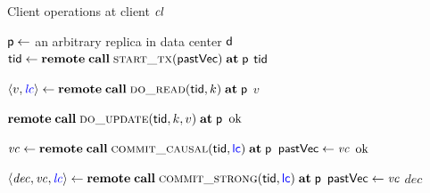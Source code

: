 
\begin{algorithm*}[t]
  \caption{Client operations at client $\mathit{cl}$}
  \label{alg:unistore-client}
  \begin{algorithmic}[1]
    \Function{\start}{\null}
      \label{line:function-starttx}
      \State ${\sf p} \gets$ an arbitrary replica in data center ${\sf d}$
        \label{line:starttx-random-partition}
      \State $\ctid \gets \rpc \Call{\starttx}{\pastVC} \at \clientcoord$
        \label{line:starttx-call-start}
        \Comment{\tscolor{$\timestamp(\start) \gets
          \snapVC^{\clientcoord}_{\clientdc}[\ctid]$}}
        \label{line:starttx-ts}
      \State \Return ${\sf tid}$
        \label{line:starttx-return}
    \EndFunction

    \Statex
     \label{line:function-read}
      \State $\langle v, \lccolor{\lcvar} \rangle \gets
        \rpc \Call{\doread}{\ctid, k} \at \clientcoord$
        \label{line:read-call-doread}
      \If{$\lcvar \neq \bot$}
        \label{line:read-is-external}
        \State \lccolor{$\lc \gets \max\set{\lc, \lcvar}$}
          \label{line:read-lc}
      \EndIf
      \State \Return $v$
        \label{line:read-return}
    \EndFunction

    \Statex
     \label{line:function-update}
      \State $\rpc \Call{\doupdate}{\ctid, k, v} \at \clientcoord$
        \label{line:update-call-doupdate}
      \State \Return $\mathrm{ok}$
        \label{line:update-return}
    \EndFunction

    \Statex
    \Function{\commitcausaltx}{\null}
      \label{line:function-commitcausaltx}
      \State {}
        \Comment{\lccolor{$\lclock(\commitcausaltx) \gets \lc$}}
        \label{line:commitcausaltx-lc}
      \State $\vcvar \gets \rpc \Call{\commitcausal}{\ctid, \lccolor{\lc}} \at \clientcoord$
        \label{line:commitcausaltx-call-commitcausal}
      \State ${\sf pastVec} \gets \mathit{vc}$
        \label{line:commitcausaltx-pastvc}
        \Comment{\tscolor{$\timestamp(\commitcausaltx) \gets \pastVC$}}
        \label{line:commitcausaltx-ts}
      \State \Return $\mathrm{ok}$
        \label{line:commitcausaltx-return}
    \EndFunction

    \Statex
    \Function{\commitstrongtx}{\null}
      \label{line:function-commitstrongtx}
      \State {}
        \label{line:commitstrongtx-lc-so}
      \State $\langle \decvar, \vcvar, \lccolor{\lcvar} \rangle \gets \rpc
        \Call{\commitstrong}{\ctid, \lccolor{\lc}} \at \clientcoord$
        \label{line:commitstrongtx-call-commitstrong}
      \If{$\decvar = \commit$}
        \label{line:commitstrongtx-if-commit}
        \State ${\sf pastVec} \gets \mathit{vc}$
          \label{line:commitstrongtx-pastvc}
          \Comment{\tscolor{$\timestamp(\commitstrongtx) \gets \pastVC$}}
          \label{line:commitstrongtx-ts}
        \State \lccolor{$\lc \gets \lcvar$}
          \Comment{\lccolor{$\lclock(\commitstrongtx) \gets \lc$}}
          \label{line:commitstrongtx-lc}
      \EndIf
      \State \Return $dec$
        \label{line:commitstrongtx-return}
    \EndFunction


\end{algorithmic}
\end{algorithm*}
